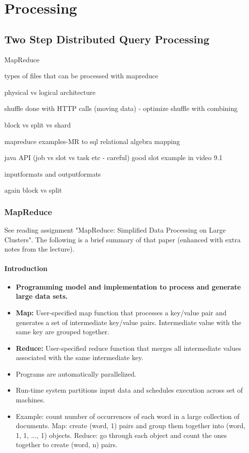 \section{Processing}

\subsection{Two Step Distributed Query Processing}


MapReduce

types of files that can be processed with mapreduce

physical vs logical architecture

shuffle done with HTTP calls (moving data) - optimize shuffle with combining

block vs split vs shard

mapreduce examples-MR to sql relational algebra mapping

java API (job vs slot vs task etc - careful) good slot example in video 9.1

inputformats and outputformats

again block vs split


\subsubsection{MapReduce}

See reading assignment "MapReduce: Simplified Data Processing on Large Clusters". The following is a brief summary of that paper (enhanced with extra notes from the lecture).

\paragraph{Introduction}
\begin{itemize}
    \item \textbf{Programming model and implementation to process and generate large data sets.}
    \item \textbf{Map:} User-specified map function that processes a key/value pair and generates a set of intermediate key/value pairs. Intermediate value with the same key are grouped together.
    \item \textbf{Reduce:} User-specified reduce function that merges all intermediate values associated with the same intermediate key.
    \item Programs are automatically parallelized.
    \item Run-time system partitions input data and schedules execution across set of machines.
    \item Example: count number of occurrences of each word in a large collection of documents. Map: create (word, 1) pairs and group them together into (word, 1, 1, ..., 1) objects. Reduce: go through each object and count the ones together to create (word, n) pairs.
\end{itemize}

